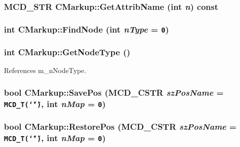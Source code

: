 \subsubsection[GetAttribName]{\setlength{\rightskip}{0pt plus 5cm}MCD\_\-STR CMarkup::GetAttribName (int {\em n}) const}\label{classCMarkup_737ea06600da95647a09bd2375e2baa3}


\subsubsection[FindNode]{\setlength{\rightskip}{0pt plus 5cm}int CMarkup::FindNode (int {\em nType} = {\tt 0})}\label{classCMarkup_e29573627f9b0cdc0d7152ff749ba407}


\subsubsection[GetNodeType]{\setlength{\rightskip}{0pt plus 5cm}int CMarkup::GetNodeType ()\hspace{0.3cm}{\tt  [inline]}}\label{classCMarkup_86a5f997b734d560b3b21c8ef89d3a57}




References m\_\-nNodeType.
\subsubsection[SavePos]{\setlength{\rightskip}{0pt plus 5cm}bool CMarkup::SavePos ({\bf MCD\_\-CSTR} {\em szPosName} = {\tt MCD\_\-T(\char`\"{}\char`\"{})}, \/  int {\em nMap} = {\tt 0})}\label{classCMarkup_21279989fdcfbed6ed4d8824b9614eb0}


\subsubsection[RestorePos]{\setlength{\rightskip}{0pt plus 5cm}bool CMarkup::RestorePos ({\bf MCD\_\-CSTR} {\em szPosName} = {\tt MCD\_\-T(\char`\"{}\char`\"{})}, \/  int {\em nMap} = {\tt 0})}\label{classCMarkup_dbab6d52d320eac695850f0b47e5b5ce}


